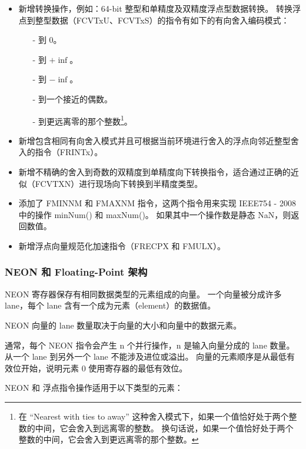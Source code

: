 \begin{itemize}
  \item 新增转换操作，例如：64-bit 整型和单精度及双精度浮点型数据转换。
    转换浮点到整型数据（FCVTxU、FCVTxS）的指令有如下的有向舍入编码模式：

    \begin{itemize}
      \item[-] 到 0。
      \item[-] 到 $+\inf$。
      \item[-] 到 $-\inf$。
      \item[-] 到一个接近的偶数。
      \item[-] 到更远离零的那个整数\footnote{在 “Nearest with ties to away” 这种舍入模式下，如果一个值恰好处于两个整数的中间，它会舍入到远离零的整数。
          换句话说，如果一个值恰好处于两个整数的中间，它会舍入到更远离零的那个整数。
        }。
    \end{itemize}
  \item 新增包含相同有向舍入模式并且可根据当前环境进行舍入的浮点向邻近整型舍入的指令（FRINTx）。
  \item 新增不精确的舍入到奇数的双精度到单精度向下转换指令，适合通过正确的近似（FCVTXN）进行现场向下转换到半精度类型。
  \item 添加了 FMINNM 和 FMAXNM 指令，这两个指令用来实现 IEEE754 - 2008 中的操作 minNum() 和 maxNum()。
  如果其中一个操作数是静态 NaN，则返回数值。
  \item 新增浮点向量规范化加速指令（FRECPX 和 FMULX）。
\end{itemize}

\subsubsection{NEON 和 Floating-Point 架构}

NEON 寄存器保存有相同数据类型的元素组成的向量。
一个向量被分成许多 lane，每个 lane 含有一个成为元素（element）的数据值。

NEON 向量的 lane 数量取决于向量的大小和向量中的数据元素。

通常，每个 NEON 指令会产生 n 个并行操作，n 是输入向量分成的 lane 数量。
从一个 lane 到另外一个 lane 不能涉及进位或溢出。
向量的元素顺序是从最低有效位开始，说明元素 0 使用寄存器的最低有效位。

NEON 和 浮点指令操作适用于以下类型的元素：

